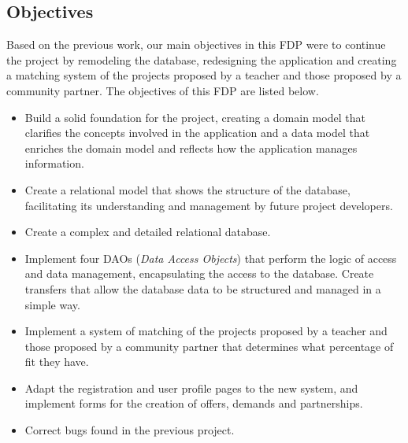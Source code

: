 \documentclass[11pt]{book}
\begin{document}
\begin{itemize}
		\section{Objectives}
		Based on the previous work, our main objectives in this FDP were to continue the project by remodeling the database, redesigning the application and creating a matching system of the projects proposed by a teacher and those proposed by a community partner.
		The objectives of this FDP are listed below.
		\begin{itemize} 
			\item Build a solid foundation for the project, creating a domain model that clarifies the concepts involved in the application and a data model that enriches the domain model and reflects how the application manages information.
			\item Create a relational model that shows the structure of the database, facilitating its understanding and management by future project developers.
			\item Create a complex and detailed relational database.
			\item Implement four DAOs (\emph{Data Access Objects}) that perform the logic of access and data management, encapsulating the access to the database. Create transfers that allow the database data to be structured and managed in a simple way.
			\item Implement a system of matching of the projects proposed by a teacher and those proposed by a community partner that determines what percentage of fit they have.
			\item Adapt the registration and user profile pages to the new system, and implement forms for the creation of offers, demands and partnerships.
			\item Correct bugs found in the previous project.	
		\end{itemize}
		

\end{itemize}
\end{document}
